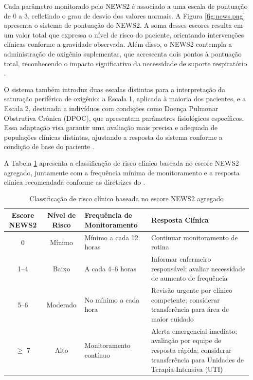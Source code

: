 \documentclass[twoside,english,brazilian]{UNISINOSmonografia}
\begin{document}
Cada parâmetro monitorado pelo NEWS2 é associado a uma escala de pontuação de 0 a 3, refletindo o grau de desvio dos valores normais. A Figura \ref{fig:news.png} apresenta o sistema de pontuação do NEWS2. A soma desses escores resulta em um valor total que expressa o nível de risco do paciente, orientando intervenções clínicas conforme a gravidade observada. Além disso, o NEWS2 contempla a administração de oxigênio suplementar, que acrescenta dois pontos à pontuação total, reconhecendo o impacto significativo da necessidade de suporte respiratório \cite{RoyalCollege2017}.

O sistema também introduz duas escalas distintas para a interpretação da saturação periférica de oxigênio: a Escala 1, aplicada à maioria dos pacientes, e a Escala 2, destinada a indivíduos com condições como Doença Pulmonar Obstrutiva Crônica (DPOC), que apresentam parâmetros fisiológicos específicos. Essa adaptação visa garantir uma avaliação mais precisa e adequada de populações clínicas distintas, ajustando a resposta do sistema conforme a condição de base do paciente \cite{Greenhalghm2020}.

A Tabela \ref{tab:news2_classificacao} apresenta a classificação de risco clínico baseada no escore NEWS2 agregado, juntamente com a frequência mínima de monitoramento e a resposta clínica recomendada conforme as diretrizes do \cite{RoyalCollege2017}.

\begin{table}[!ht]
\centering
\caption{Classificação de risco clínico baseada no escore NEWS2 agregado}
\label{tab:news2_classificacao}
\footnotesize
\begin{tabular}{|c|c|p{3.5cm}|p{4cm}|}
\hline
\textbf{Escore NEWS2} & \textbf{Nível de Risco} & \textbf{Frequência de Monitoramento} & \textbf{Resposta Clínica} \\ \hline
0 & Mínimo & Mínimo a cada 12 horas & Continuar monitoramento de rotina \\ \hline
1--4 & Baixo & A cada 4--6 horas & Informar enfermeiro responsável; avaliar necessidade de aumento de frequência \\ \hline
5--6 & Moderado & No mínimo a cada hora & Revisão urgente por clínico competente; considerar transferência para área de maior cuidado \\ \hline
$\geq$ 7 & Alto & Monitoramento contínuo & Alerta emergencial imediato; avaliação por equipe de resposta rápida; considerar transferência para Unidades de Terapia Intensiva (UTI) \\ \hline
\end{tabular}
\end{table}
\end{document}
